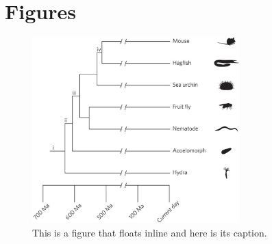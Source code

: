 
\section*{Figures}

\begin{figure}
\includegraphics[width=8cm]{figures/fig1}
\caption[Short figure name.]{This is a figure that floats inline and here is its caption.
\label{fig:myInlineFigure55}}
\end{figure}